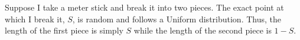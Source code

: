 \documentclass[addpoints,12pt]{exam}
\begin{document}
\begin{questions}

\question Suppose I take a meter stick and break it into two pieces. The exact point at which I break it, $S$, is random and follows a Uniform distribution. Thus, the length of the first piece is simply $S$ while the length of the second piece is $1-S$.
	\begin{parts}

\end{parts}
\end{questions}
\end{document}
